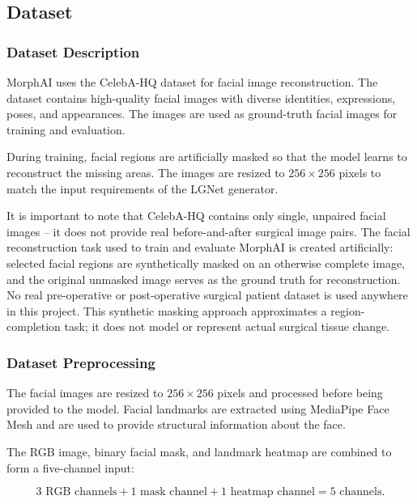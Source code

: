 \subsection{Dataset}

\subsubsection{Dataset Description}

MorphAI uses the CelebA-HQ dataset for facial image reconstruction. The
dataset contains high-quality facial images with diverse identities,
expressions, poses, and appearances. The images are used as ground-truth
facial images for training and evaluation.

\noindent During training, facial regions are artificially masked so that
the model learns to reconstruct the missing areas. The images are resized
to $256 \times 256$ pixels to match the input requirements of the LGNet
generator.

\noindent It is important to note that CelebA-HQ contains only single, unpaired facial images -- 
it does not provide real before-and-after surgical image pairs. The facial reconstruction 
task used to train and evaluate MorphAI is created artificially: selected facial regions 
are synthetically masked on an otherwise complete image, and the original unmasked image 
serves as the ground truth for reconstruction. No real pre-operative or post-operative 
surgical patient dataset is used anywhere in this project. This synthetic masking 
approach approximates a region-completion task; it does not model or represent actual 
surgical tissue change.

\subsubsection{Dataset Preprocessing}

The facial images are resized to $256 \times 256$ pixels and processed
before being provided to the model. Facial landmarks are extracted using
MediaPipe Face Mesh and are used to provide structural information about
the face.

\noindent The RGB image, binary facial mask, and landmark heatmap are
combined to form a five-channel input:

\begin{equation}
3\text{ RGB channels} + 1\text{ mask channel} + 1\text{ heatmap channel}
= 5\text{ channels}.
\end{equation}

